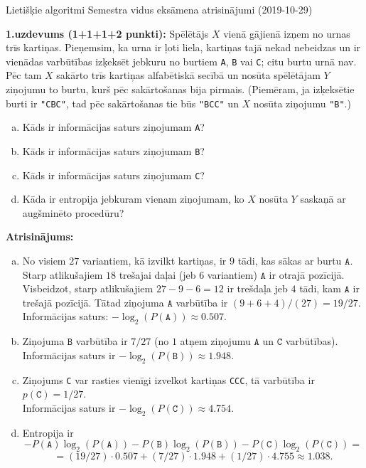 \documentclass[11pt]{article}
\begin{document}
\thispagestyle{empty}

{\Large Lietišķie algoritmi \textendash{} Semestra vidus eksāmena atrisinājumi (2019-10-29)}

{\footnotesize
{\bf 1.uzdevums (1+1+1+2 punkti):}
Spēlētājs $X$ vienā gājienā izņem no urnas trīs kartiņas. 
Pieņemsim, ka urna ir ļoti liela, kartiņas tajā nekad nebeidzas un ir vienādas varbūtības
izķeksēt jebkuru no burtiem {\tt A}, {\tt B} vai {\tt C}; citu burtu urnā nav.
Pēc tam $X$ sakārto trīs kartiņas alfabētiskā secībā un nosūta spēlētājam $Y$ ziņojumu \textendash{} to burtu, kurš 
pēc sakārtošanas bija pirmais. (Piemēram, ja izķeksētie burti ir {\tt "CBC"}, tad pēc sakārtošanas tie būs {\tt "BCC"} un 
$X$ nosūta ziņojumu {\tt "B"}.) 
\begin{enumerate}[(a)]
\item Kāds ir informācijas saturs ziņojumam {\tt A}?
\item Kāds ir informācijas saturs ziņojumam {\tt B}? 
\item Kāds ir informācijas saturs ziņojumam {\tt C}? 
\item Kāda ir entropija jebkuram vienam ziņojumam, ko $X$ nosūta $Y$ saskaņā ar augšminēto procedūru?
\end{enumerate}
}

\vspace{6pt}
{\bf Atrisinājums:}


\begin{enumerate}[(a)]
\item No visiem $27$ variantiem, kā izvilkt kartiņas, ir $9$ tādi, kas sākas ar burtu $\mathtt{A}$. Starp atlikušajiem 
$18$ trešajai daļai (jeb $6$ variantiem) $\mathtt{A}$ ir otrajā pozīcijā. Visbeidzot, starp 
atlikušajiem $27 - 9 - 6 = 12$ ir trešdaļa jeb $4$ tādi, kam $\mathtt{A}$ ir trešajā pozīcijā. Tātad
ziņojuma $\mathtt{A}$ varbūtība ir $(9+6+4)/(27) = 19/27$.\\
Informācijas saturs: $-\log_2\left(P(\mathtt{A})\right) \approx 0.507$. 
\item Ziņojuma $\mathtt{B}$ varbūtība ir $7/27$ (no $1$ atņem ziņojumu $\mathtt{A}$ un $\mathtt{C}$ varbūtības).\\ 
Informācijas saturs ir $-\log_2\left(P(\mathtt{B})\right) \approx 1.948$.
\item Ziņojums {\tt C} var rasties vienīgi izvelkot kartiņas {\tt CCC}, tā varbūtība ir $p(\mathtt{C}) = 1/27$.\\
Informācijas saturs ir $-\log_2\left(P(\mathtt{C})\right) \approx 4.754$. 
\item Entropija ir 
$$-P(\mathtt{A})\log_2(P(\mathtt{A})) -P(\mathtt{B})\log_2(P(\mathtt{B})) - P(\mathtt{C})\log_2(P(\mathtt{C})) =$$
$$ = (19/27)\cdot 0.507 + (7/27)\cdot 1.948 + (1/27) \cdot 4.755 \approx 1.038.$$
\end{enumerate}
\end{document}
